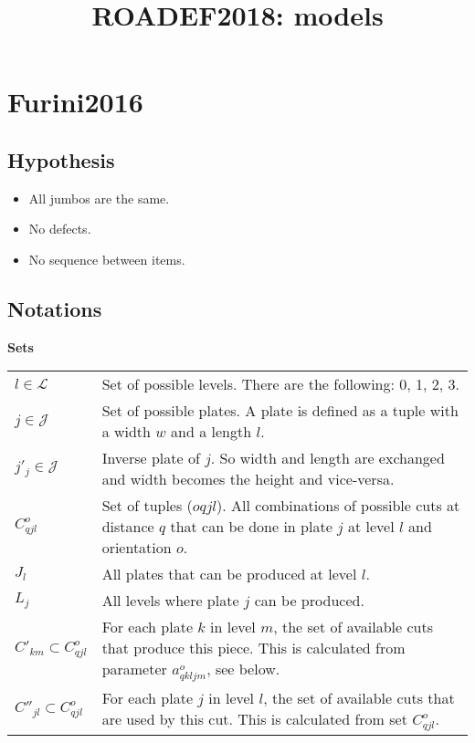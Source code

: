 \documentclass[a4paper,11pt]{article}
\title{ROADEF2018: models}
\author{}
\begin{document}
\maketitle

\section{Furini2016}

    \subsection{Hypothesis}

    \begin{itemize}
        \item All jumbos are the same.
        \item No defects.
        \item No sequence between items.
    \end{itemize}

    \subsection{Notations}

    \vskip 0.3cm

    \textbf{Sets}

    \begin{tabular}{p{20mm}p{120mm}}
        $l \in \mathcal{L}$ & Set of possible levels. There are the following: 0, 1, 2, 3. \\
        $j \in \mathcal{J}$ & Set of possible plates. A plate is defined as a tuple with a width $w$ and a length $l$. \\
        $j'_j \in \mathcal{J}$ & Inverse plate of $j$. So width and length are exchanged and width becomes the height and vice-versa. \\
        $C^o_{qjl}$ & Set of tuples ($oqjl$). All combinations of possible cuts at distance $q$ that can be done in plate $j$ at level $l$ and orientation $o$. \\
        $J_{l}$ & All plates that can be produced at level $l$.\\
        $L_{j}$ & All levels where plate $j$ can be produced.\\
        $C'_{km} \subset C^o_{qjl}$ & For each plate $k$ in level $m$, the set of available cuts that produce this piece. This is calculated from parameter $a^o_{qkljm}$, see below. \\
        $C''_{jl} \subset C^o_{qjl}$ & For each plate $j$ in level $l$, the set of available cuts that are used by this cut. This is calculated from set $C^o_{qjl}$. \\
    \end{tabular}
\end{document}
